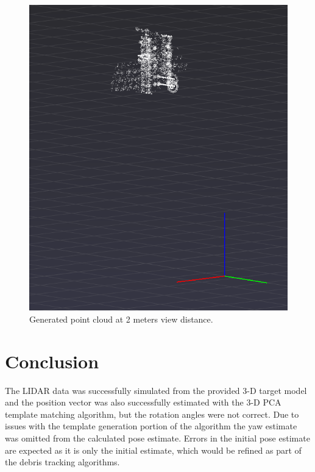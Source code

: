 \documentclass[conference]{IEEEtran}
\begin{document}
	\begin{figure}[htbp]
		\centerline{\includegraphics[scale=1]{Images/Experiment2_2m.PNG}}
		\caption{Generated point cloud at 2 meters view distance.}
		\label{Experiment2pc}
	\end{figure}

	\section{Conclusion}
		The LIDAR data was successfully simulated from the provided 3-D target model and the position vector was also successfully estimated with the 3-D PCA template matching algorithm, but the rotation angles were not correct. Due to issues with the template generation portion of the algorithm the yaw estimate was omitted from the calculated pose estimate. Errors in the initial pose estimate are expected as it is only the initial estimate, which would be refined as part of the debris tracking algorithms. 

	\nocite{*}
	\printbibliography
	
\end{document}
